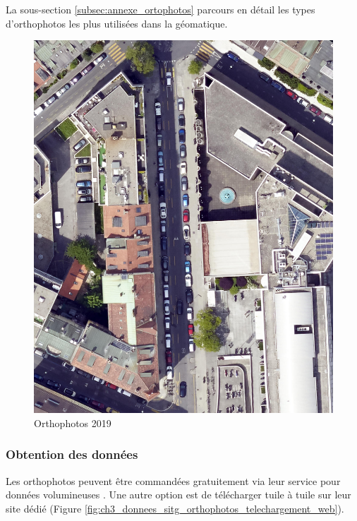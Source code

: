 La sous-section \ref{subsec:annexe_ortophotos} parcours en détail les types d'orthophotos les plus utilisées dans la géomatique.

\begin{figure}[H]
    \centering
    \includegraphics[width=1\linewidth]{02-main//figures/ch3/ch3_dataset_methodo_01_orthophoto_2019.png}
    \caption{Orthophotos 2019}
    \label{fig:ch3_dataset_methodo_01_orthophoto_2019}
\end{figure}

\subsubsection{Obtention des données}
Les orthophotos peuvent être commandées gratuitement via leur service pour données volumineuses \cite{sitg_commande_nodate}. Une autre option est de télécharger tuile à tuile sur leur site dédié (Figure \ref{fig:ch3_donnees_sitg_orthophotos_telechargement_web}).

